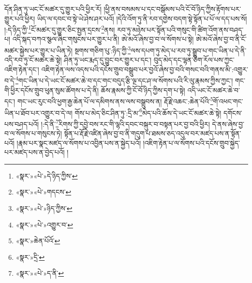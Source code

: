 དོན་ཤིན་ཏུ་ཡང་ངོ་མཚར་དུ་གྱུར་པའི་ཕྱིར་རོ། །ཕྱི་ནས་བསམས་པ་དང་བསྒོམས་པའི་ངོ་བོ་ཉིད་ཀྱིས་རྟོགས་པར་གྱུར་པའི་ཕྱིར། ཡིད་ལ་དབང་བ་སྟེ་ཡེ་ཤེས་ཤར་པའོ། །དེའི་འོག་ཏུ་ནི་རབ་དགྱེས་བདག་སྟེ་སྟོན་པ་པོ་ལ་དད་པས་སོ། །:དེ་ཉིད་ཀྱི་\footnote{«སྣར་»«པེ་»དེ་ཉིད་ཀྱིས་}ངོ་མཚར་དུ་གྱུར་ཅིང་སྤྱན་དྲངས་\footnote{«སྣར་»«པེ་»གདངས་}ནས། རབ་ཏུ་མཉེས་པར་སྟོན་པའི་གསུང་གི་ཚིག་འོག་ནས་བཤད་པ། འདི་སྐད་བཀའ་སྩལ་ཞིང་གསུངས་པར་གྱུར་པ་ནི། ཨེ་མའོ་ཞེས་བྱ་བ་ལ་སོགས་པ་སྟེ། ཨེ་མའོ་ཞེས་བྱ་བ་ནི་ངོ་མཚར་སྐྱེས་པར་གྱུར་པ་ཡིན་ཏེ། སྔགས་གཅིག་པུ་:ཉིད་ཀྱི་\footnote{«སྣར་»«པེ་»ཉིད་ཀྱིས་}ལས་དཔག་ཏུ་མེད་པ་རབ་ཏུ་སྒྲུབ་པ་གང་ཡིན་པ་དེ་ནི་འདི་རབ་ཏུ་ངོ་མཚར་ཆེ་སྟེ། ཤིན་ཏུ་ཡང་རྨད་དུ་བྱུང་བར་གྱུར་པ་དང་། བུད་མེད་དང་ལྷན་ཅིག་རོལ་པས་ཀྱང་འཇིག་རྟེན་དང་། འཇིག་རྟེན་ལས་འདས་པའི་དངོས་གྲུབ་བསྒྲུབ་པར་བྱའོ་ཞེས་བྱ་བའི་གསང་བའི་གནས་མི་:འགྱུར་བ་དེ་\footnote{«སྣར་»«པེ་»འགྱུར་བ་}གང་ཡིན་པ་དེ་ཡང་ངོ་མཚར་ཆེ་བ་དང་གང་བདུད་རྩི་ལྔ་དང་ཤ་ལ་སོགས་པའི་རི་ལུ་རྣམས་ཀྱིས་ཀྱང་། གང་གི་ཕྱིར་དངོས་གྲུབ་ཕུན་སུམ་ཚོགས་པ་དེ་ནི། ཆོས་རྣམས་ཀྱི་ངོ་བོ་ཉིད་ཀྱིས་དག་པ་སྟེ། འདི་ཡང་ངོ་མཚར་ཆེ་བ་དང་། གང་ཡང་རུང་བའི་ཕྱག་རྒྱ་ཆེན་པོ་ལ་དམིགས་ནས་ལས་བསྒྲུབས་ན། རྡོ་རྗེ་འཆང་:ཆེན་པོའི་\footnote{«སྣར་»ཆེན་པོའོ་}གོ་འཕང་གང་ཡིན་པ་ཐོབ་པར་འགྱུར་བ་དེ་ལ། གོས་པ་མེད་ཅིང་ཤིན་ཏུ་:དྲི་མ་\footnote{«སྣར་»དྲི་}མེད་པའི་ཆོས་དེ་ཡང་ངོ་མཚར་ཆེ་སྟེ། དགོངས་པས་བཤད་པའོ། །:དེ་ནི་\footnote{«སྣར་»«པེ་»ད་ནི་}རིགས་ཀྱི་དབྱེ་བས་རང་གི་ལྷའི་དབང་བསྐུར་བ་བསྟན་པར་བྱ་བའི་ཕྱིར། དེ་ནས་ཞེས་བྱ་བ་ལ་སོགས་པ་གསུངས་ཏེ། སྟོན་པ་རྡོ་རྗེ་འཛིན་ཞེས་བྱ་བ་ནི་གདུག་པ་ཐམས་ཅད་འདུལ་བར་མཛད་པས་ན་སྟོན་པའོ། །རྣམ་པར་སྣང་མཛད་ལ་སོགས་པ་འབྱིན་པས་ན་སྐྱེད་པའོ། །འཇིག་རྟེན་པ་ལ་སོགས་པའི་དངོས་གྲུབ་སྐྱེད་པར་མཛད་པས་ན་བྱེད་པའོ། །
